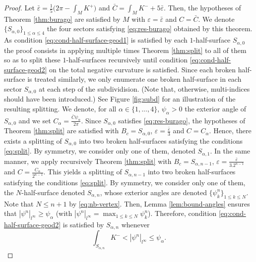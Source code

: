 \documentclass{article}
\newcommand{\surf}{M}
\newcommand{\HalfP}{S}
\newcommand{\halfP}{B}
\theoremstyle{remark}
\theoremstyle{prpart}
\begin{document}
\begin{proof}
Let $\bar\varepsilon = \frac{1}{5}\big(2\pi-\int_{\surf}K^+\big)$ and $\bar C = \int_\surf K^- + 5\bar\varepsilon$. Then, the hypotheses of Theorem \ref{thm:burago} are satisfied by $\surf$ with $\varepsilon = \bar\varepsilon$ and $C=\bar C$. We denote $\{\HalfP_{\alpha,0}\}_{1\leq \alpha\leq 4}$ the four sectors satisfying \eqref{eq:res-burago} obtained by this theorem. 
As condition \eqref{eq:cond-half-surface-geod1} is satisfied by each $1$-half-surface $\HalfP_{\alpha,0}$ the proof consists in applying multiple times Theorem \ref{thm:split} to all of them so as to split these $1$-half-surfaces recursively until condition \eqref{eq:cond-half-surface-geod2} on the total negative curvature is satisfied. Since each broken half-surface is treated similarly, we only enumerate one broken half-surface in each sector $\HalfP_{\alpha,0}$ at each step of the subdividision. (Note that, otherwise, multi-indices should have been introduced.)
See Figure \ref{fig:subd} for an illustration of the resulting splitting. We denote, for all $\alpha\in \{1,...,4\}$, $\psi_\alpha>0$ the exterior angle of $\HalfP_{\alpha,0}$ and we set $C_{\alpha}=\frac{\bar C\psi_\alpha}{2\pi}$. Since $\HalfP_{\alpha,0}$ satisfies \eqref{eq:res-burago}, the hypotheses of Theorem \ref{thm:split} are satisfied with $\halfP_c=\HalfP_{\alpha,0}$, $\varepsilon = \frac{\bar\varepsilon}{3}$ and $C=C_{\alpha}$. Hence, there exists a splitting of $\HalfP_{\alpha,0}$ into two broken half-surfaces satisfying the conditions \eqref{eq:split}. By symmetry, we consider only one of them, denoted $\HalfP_{\alpha,1}$. In the same manner, we apply recursively Theorem \ref{thm:split} with $\halfP_c = \HalfP_{\alpha,n-1}$, $\varepsilon = \frac{\bar\varepsilon}{3.2^{n-1}}$ and $C=\frac{C_\alpha}{2^{n-1}}$. This yields a splitting of $\HalfP_{\alpha,n-1}$ into two broken half-surfaces satisfying the conditions \eqref{eq:split}. By symmetry, we consider only one of them, the $N$-half-surface denoted $\HalfP_{\alpha,n}$, whose exterior angles are denoted $\{\psi^n_k\}_{1\leq k\leq N}$.
Note that $N\leq n+1$ by \eqref{eq:nb-vertex}. Then, Lemma \ref{lem:bound-angles} ensures that $|\psi^n|_{l^\infty}\geq \psi_\alpha$ (with $|\psi^n|_{l^\infty} = \max_{1\leq k\leq N}\psi_k^n$). Therefore, condition \eqref{eq:cond-half-surface-geod2} is satisfied by $\HalfP_{\alpha,n}$ whenever
\begin{equation}\label{eq:pr-splitting-surf}
\int_{\HalfP_{\alpha,n}}K^-< |\psi^n|_{l^\infty} \leq \psi_\alpha.
\end{equation}

\end{proof}
\end{document}
